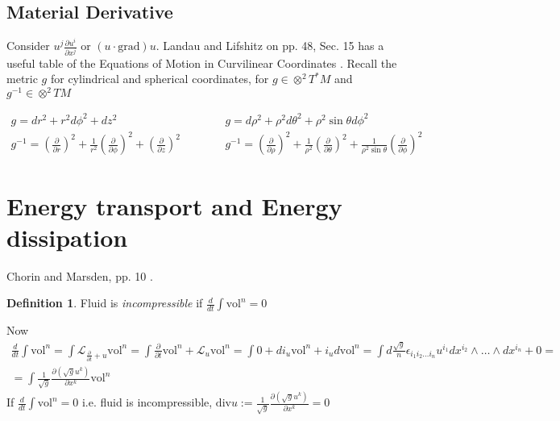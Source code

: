 \documentclass[twoside,landscape,10pt]{amsart}
\theoremstyle{plain}
\theoremstyle{definition}
\newtheorem{definition}{Definition}
\theoremstyle{remark}
\theoremstyle{remark}
\begin{document}
\begin{multicols*}{2}
\subsection{Material Derivative}

Consider $u^j \frac{ \partial u^i}{ \partial x^j}$ or $(u\cdot \text{grad})u$.  Landau and Lifshitz on pp. 48, Sec. 15 has a useful table of the Equations of Motion in Curvilinear Coordinates \cite{LLandauELifshitz1987}.  Recall the metric $g$ for cylindrical and spherical coordinates, for $g\in \otimes^2 T^*M$ and $g^{-1} \in \otimes^2 TM$

\[
\begin{gathered}
  g = dr^2 + r^2 d\phi^2 + dz^2 \\
  g^{-1} = (\frac{\partial}{\partial r})^2 + \frac{1}{r^2} (\frac{ \partial }{ \partial \phi })^2 + ( \frac{ \partial }{ \partial z} )^2
\end{gathered} \quad \quad \quad \, 
\begin{gathered}
  g = d\rho^2 + \rho^2 d\theta^2 + \rho^2 \sin{\theta} d\phi^2  \\
  g^{-1} = (\frac{\partial}{\partial \rho})^2 + \frac{1}{\rho^2} (\frac{ \partial }{ \partial \theta })^2 + \frac{1}{ \rho^2 \sin{\theta}}( \frac{ \partial }{ \partial \phi} )^2
\end{gathered}
\]

\section{Energy transport and Energy dissipation}

Chorin and Marsden, pp. 10 \cite{AChorinJMarsden2000}.

\begin{definition}
  Fluid is \emph{incompressible} if $\frac{d}{dt} \int \text{vol}^n =0$
\end{definition}

Now 
\[
\begin{gathered}
  \frac{d}{dt} \int \text{vol}^n = \int \mathcal{L}_{ \frac{ \partial }{ \partial t} + u } \text{vol}^n = \int \frac{ \partial }{ \partial t} \text{vol}^n + \mathcal{L}_u \text{vol}^n = \int 0 + di_u \text{vol}^n + i_u d\text{vol}^n = \int d \frac{\sqrt{g}}{ n } \epsilon_{i_1 i_2 \dots i_n} u^{i_1 } dx^{i_2} \wedge \dots \wedge dx^{i_n} + 0 = \\
  = \int \frac{1}{\sqrt{g}} \frac{ \partial (\sqrt{g} u^k )}{ \partial x^k} \text{vol}^n 
\end{gathered}
\]
If $\frac{d}{dt} \int \text{vol}^n =0$ i.e. fluid is incompressible, $\text{div}u := \frac{1}{\sqrt{g}} \frac{ \partial (\sqrt{g} u^k  )}{ \partial x^k } = 0 $  


\end{multicols*}
\end{document}
